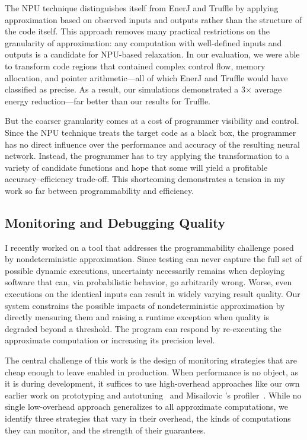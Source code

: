 The NPU technique distinguishes itself from EnerJ and Truffle by applying
approximation based on observed inputs and outputs rather than the structure
of the code itself. This approach removes many practical restrictions on the
granularity of approximation: any computation with well-defined inputs and
outputs is a candidate for NPU-based relaxation. In our evaluation, we were
able to transform code regions that contained complex control flow, memory
allocation, and pointer arithmetic---all of which EnerJ and Truffle would have
classified as precise. As a result, our simulations demonstrated a 3$\times$
average energy reduction---far better than our results for Truffle.

But the coarser granularity comes at a cost of programmer visibility and
control. Since the NPU technique treats the target code as a black box, the
programmer has no direct influence over the performance and accuracy of the
resulting neural network. Instead, the programmer has to try applying the
transformation to a variety of candidate functions and hope that some will
yield a profitable accuracy--efficiency trade-off.
This shortcoming demonstrates a tension in my work so far between
programmability and efficiency.


\subsection{Monitoring and Debugging Quality}

I recently worked on a tool that addresses the programmability challenge posed
by nondeterministic approximation. Since testing can never capture
the full set of possible dynamic executions, uncertainty necessarily remains
when deploying software that can, via probabilistic behavior, go arbitrarily
wrong. Worse, even executions on the identical inputs can result in
widely varying result quality. Our system constrains the possible impacts of
nondeterministic approximation by directly measuring them and raising a
runtime exception when quality is degraded beyond a threshold. The program can
respond by re-executing the approximate computation or increasing its
precision level.

The central challenge of this work is the design of monitoring strategies that
are cheap enough to leave enabled in production. When performance is no object,
as it is during development, it suffices to use high-overhead approaches like our
own earlier work on prototyping and autotuning~\cite{enercaml} and Misailovic
\etal's profiler~\cite{qosprof}.
While no single low-overhead approach
generalizes to all approximate computations, we identify three strategies that
vary in their overhead, the kinds of computations they can monitor, and the
strength of their guarantees.

